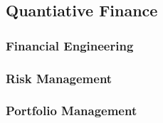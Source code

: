 \documentclass[../main.tex]{subfiles}
\begin{document}
\subsection{Quantiative Finance}

\subsubsection{Financial Engineering}

\subsubsection{Risk Management}

\subsubsection{Portfolio Management}
\end{document}

